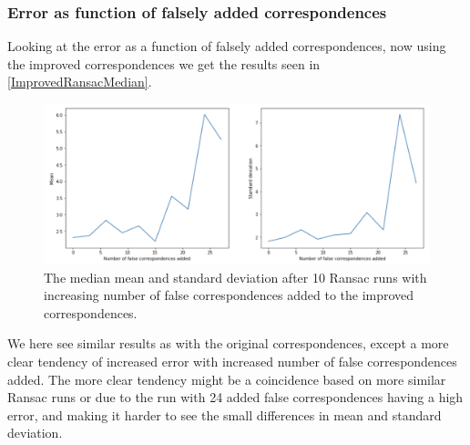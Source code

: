 \subsubsection{Error as function of falsely added correspondences }
Looking at the error as a function of falsely added correspondences, now using the improved correspondences we get the results seen in \autoref{ImprovedRansacMedian}.

\begin{figure}[h]
	\centering
	\includegraphics[width=\linewidth]{Materials/ImprovedRansacMedian}
	\caption{The median mean and standard deviation after 10 Ransac runs with increasing number of false correspondences added to the improved correspondences.}
	\label{ImprovedRansacMedian}
\end{figure}
We here see similar results as with the original correspondences, except a more clear tendency of increased error with increased number of false correspondences added. The more clear tendency might be a coincidence based on more similar Ransac runs or due to the run with 24 added false correspondences having a high error, and making it harder to see the small differences in mean and standard deviation. 